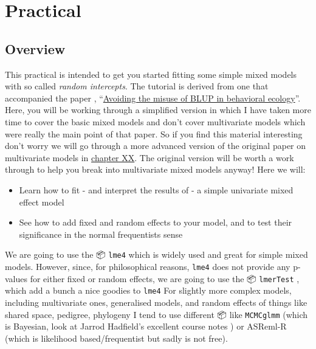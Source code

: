 \documentclass[
  12pt,
]{book}
\providecommand{\tightlist}{%
  \setlength{\itemsep}{0pt}\setlength{\parskip}{0pt}}
\begin{document}
\hypertarget{practical-2}{%
\section{Practical}\label{practical-2}}

\hypertarget{overview}{%
\subsection{Overview}\label{overview}}

This practical is intended to get you started fitting some simple mixed models with so called \emph{random intercepts}. The tutorial is derived from one that accompanied the paper \citep{houslay_avoiding_2017}, ``\href{https://doi.org/10.1093/beheco/arx023}{Avoiding the misuse of BLUP in behavioral ecology}''. Here, you will be working through a simplified version in which I have taken more time to cover the basic mixed models and don't cover multivariate models which were really the main point of that paper. So if you find this material interesting don't worry we will go through a more advanced version of the original paper on multivariate models in \protect\hyperlink{to_be_written}{chapter XX}. The original version will be worth a work through to help you break into multivariate mixed models anyway! Here we will:

\begin{itemize}
\tightlist
\item
  Learn how to fit - and interpret the results of - a simple univariate mixed effect model
\item
  See how to add fixed and random effects to your model, and to test their significance in the normal frequentists sense
\end{itemize}

We are going to use the 📦 \texttt{lme4} \citep{R-lme4} which is widely used and great for simple mixed models. However, since, for philosophical reasons, \texttt{lme4} does not provide any p-values for either fixed or random effects, we are going to use the 📦 \texttt{lmerTest} \citep{R-lmerTest}, which add a bunch a nice goodies to \texttt{lme4} For slightly more complex models, including multivariate ones, generalised models, and random effects of things like shared space, pedigree, phylogeny I tend to use different 📦 like \texttt{MCMCglmm} \citep{MCMCglmm2010} (which is Bayesian, look at Jarrod Hadfield's excellent course notes \citep{R-MCMCglmm}) or ASReml-R \citep{R-asreml} (which is likelihood based/frequentist but sadly is not free).
\end{document}
